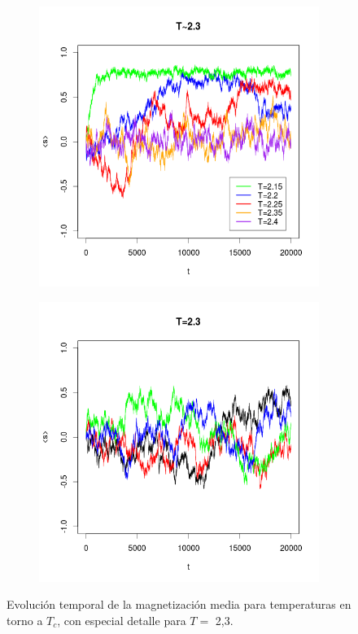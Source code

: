 \documentclass{scrartcl}
\begin{document}
\begin{figure}[ht]
\centering
\begin{subfigure}{.6\textwidth}
  \centering
  \includegraphics[width=1\linewidth]{Tno23}
\end{subfigure}
\begin{subfigure}{.6\textwidth}
  \centering
  \includegraphics[width=1\linewidth]{T23}
\end{subfigure}
\caption{Evolución temporal de la magnetización media para temperaturas en torno a $T_c$, con especial detalle para $T=$ 2,3.}
\label{fig:tempTc}
\end{figure}
\end{document}
